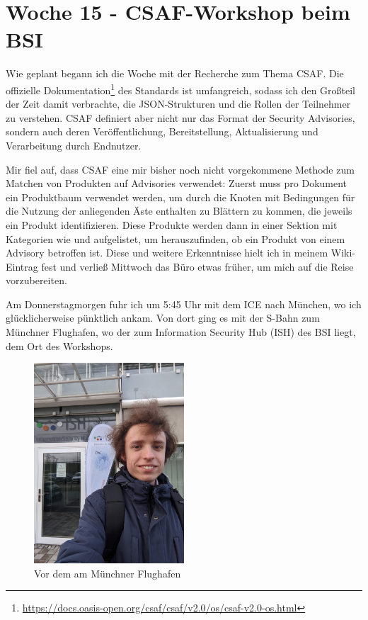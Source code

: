 \section{Woche 15 - CSAF-Workshop beim BSI} \label{sec:bericht-wo-15-initial}


\lweekdaymarginpar{\weekdayMondayShort, \weekdayTuesdayShort, \weekdayWednesdayShort}

Wie geplant begann ich die Woche mit der Recherche zum Thema CSAF\@.
Die offizielle Dokumentation\footnote{\url{https://docs.oasis-open.org/csaf/csaf/v2.0/os/csaf-v2.0-os.html}} des Standards ist umfangreich, sodass ich den Großteil der Zeit damit verbrachte, die JSON-Strukturen und die Rollen der Teilnehmer zu verstehen.
CSAF definiert aber nicht nur das Format der Security Advisories, sondern auch deren Veröffentlichung, Bereitstellung, Aktualisierung und Verarbeitung durch Endnutzer.

Mir fiel auf, dass CSAF eine mir bisher noch nicht vorgekommene Methode zum Matchen von Produkten auf Advisories verwendet:
Zuerst muss pro Dokument ein Produktbaum verwendet werden, um durch die Knoten mit Bedingungen für die Nutzung der anliegenden Äste enthalten zu Blättern zu kommen, die jeweils ein Produkt identifizieren.
Diese Produkte werden dann in einer Sektion mit Kategorien wie  und  aufgelistet, um herauszufinden, ob ein Produkt von einem Advisory betroffen ist.
Diese und weitere Erkenntnisse hielt ich in meinem Wiki-Eintrag fest und verließ Mittwoch das Büro etwas früher, um mich auf die Reise vorzubereiten.

\sweekdaymarginpar{\weekdayThursdayLong}

Am Donnerstagmorgen fuhr ich um 5:45 Uhr mit dem ICE nach München, wo ich glücklicherweise pünktlich ankam.
Von dort ging es mit der S-Bahn zum Münchner Flughafen, wo der zum Information Security Hub (ISH) des BSI liegt, dem Ort des Workshops.

\begin{figure}[htbp] %
    \centering
    \includegraphics[width=0.5\textwidth, keepaspectratio]{res/img/2023-12-14-yan-vor-dem-ish-muenchen}
    \caption{Vor dem  am Münchner Flughafen}
    \label{fig:yan-ish-csaf-muenchen-initial}
\end{figure}

